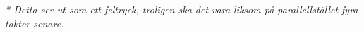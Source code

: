 \vspace{10mm}
\textit{
* Detta ser ut som ett feltryck, troligen ska det vara
\hspace{0.8mm}\hspace{0.5mm}
liksom på parallellstället fyra takter senare.
}